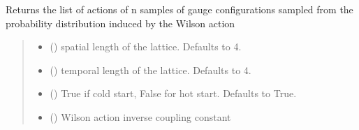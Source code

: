\documentclass[letterpaper,10pt,english]{sphinxmanual}
\begin{document}
\begin{fulllineitems}
\label{\detokenize{ECMC:ECMC.walker_action}}
\pysigstartsignatures
\pysiglinewithargsret
{}
{\sphinxparamcomma {}\sphinxparamcomma {}\sphinxparamcomma {}\sphinxparamcomma {}\sphinxparamcomma {}\sphinxparamcomma {}\sphinxparamcomma {}}
{}
\pysigstopsignatures
\sphinxAtStartPar
Returns the list of actions of n samples of gauge configurations sampled from the probability distribution induced by the Wilson action
\begin{quote}\begin{description}
\begin{itemize}
\item {} 
\sphinxAtStartPar
{} (\sphinxstyleliteralemphasis{\sphinxupquote{, }}) \textendash{} spatial length of the lattice. Defaults to 4.

\item {} 
\sphinxAtStartPar
{} (\sphinxstyleliteralemphasis{\sphinxupquote{, }}) \textendash{} temporal length of the lattice. Defaults to 4.

\item {} 
\sphinxAtStartPar
{} (\sphinxstyleliteralemphasis{\sphinxupquote{, }}) \textendash{} True if cold start, False for hot start. Defaults to True.

\item {} 
\sphinxAtStartPar
{} () \textendash{} Wilson action inverse coupling constant


\end{itemize}
\end{description}
\end{quote}
\end{fulllineitems}
\end{document}
